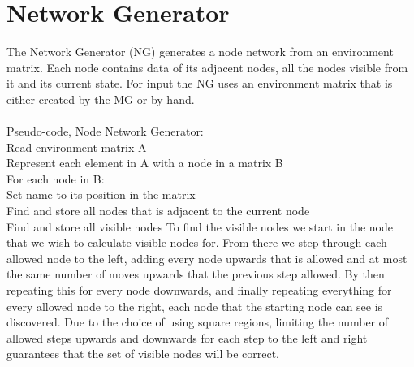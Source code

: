 \section{Network Generator}
The Network Generator (NG) generates a node network from an environment matrix. Each node contains data of its adjacent nodes, all the nodes visible from it and its current state. For input the NG uses an environment matrix that is either created by the MG or by hand.\\
\\
\noindent Pseudo-code, Node Network Generator:\\
\indent Read environment matrix A\\
\indent Represent each element in A with a node in a matrix B\\
\indent For each node in B:\\
\indent \indent Set name to its position in the matrix\\
\indent \indent Find and store all nodes that is adjacent to the current node\\
\indent \indent Find and store all visible nodes
To find the visible nodes we start in the node that we wish to calculate visible nodes for. From there we step through each allowed node to the left, adding every node upwards that is allowed and at most the same number of moves upwards that the previous step allowed. By then repeating this for every node downwards, and finally repeating everything for every allowed node to the right, each node that the starting node can see is discovered. Due to the choice of using square regions, limiting the number of allowed steps upwards and downwards for each step to the left and right guarantees that the set of visible nodes will be correct.
